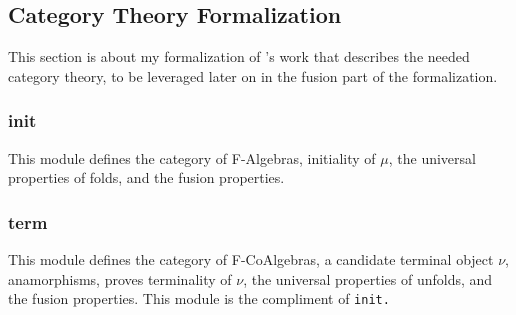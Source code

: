 
\subsection{Category Theory Formalization}
This section is about my formalization of \cite{Harper2011}'s work that describes the needed category theory, to be leveraged later on in the fusion part of the formalization.
\subsubsection{init}
This module defines the category of F-Algebras, initiality of $\mu$, the universal properties of folds, and the fusion properties.



\subsubsection{term}
This module defines the category of F-CoAlgebras, a candidate terminal object $\nu$, anamorphisms, proves terminality of $\nu$, the universal properties of unfolds, and the fusion properties.
This module is the compliment of \tt{init}.


